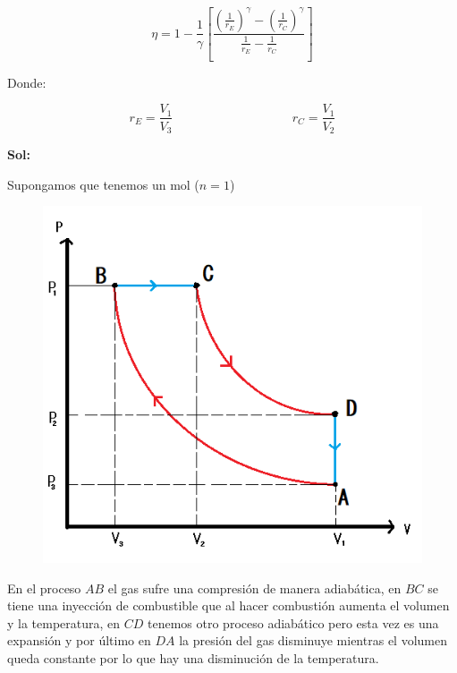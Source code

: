 \documentclass[12pt,a4paper]{article}
\begin{document}
\begin{enumerate}
    \begin{equation*}
        \eta = 1 - \frac{1}{\gamma} \left[\frac{\left(\frac{1}{r_E}\right)^{\gamma} - \left(\frac{1}{r_C}\right)^{\gamma}}{\frac{1}{r_E} - \frac{1}{r_C}}\right]
    \end{equation*}
    
    Donde:
    
    \begin{equation*}
        r_E = \frac{V_1}{V_3} \hspace{4cm} r_C = \frac{V_1}{V_2}
    \end{equation*}
    
    
    \textbf{Sol:}
    
    Supongamos que tenemos un mol ($n=1$)
    
    \begin{figure}[h!]
        \centering
        \includegraphics[scale=0.8]{1.png}
    \end{figure}
    
    En el proceso $AB$ el gas sufre una compresión de manera adiabática, en $BC$ se tiene una inyección de combustible  que al hacer combustión aumenta el volumen y la temperatura, en $CD$ tenemos otro proceso adiabático pero esta vez es una expansión y por último en $DA$ la presión del gas disminuye mientras el volumen queda constante por lo que hay una disminución de la temperatura.
    

\end{enumerate}
\end{document}
